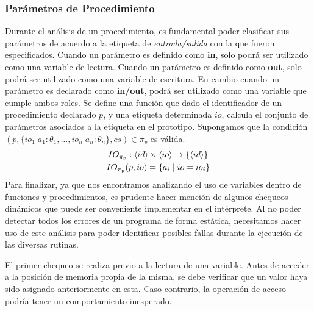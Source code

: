 \subsubsection{Parámetros de Procedimiento}

Durante el análisis de un procedimiento, es fundamental poder clasificar sus parámetros de acuerdo a la etiqueta de \textit{entrada/salida} con la que fueron especificados.
Cuando un parámetro es definido como \textbf{in}, solo podrá ser utilizado como una variable de lectura.
Cuando un parámetro es definido como \textbf{out}, solo podrá ser utilizado como una variable de escritura.
En cambio cuando un parámetro es declarado como \textbf{in/out}, podrá ser utilizado como una variable que cumple ambos roles.
Se define una función que dado el identificador de un procedimiento declarado $p$, y una etiqueta determinada $io$, calcula el conjunto de parámetros asociados a la etiqueta en el prototipo.
Supongamos que la condición $(p, \{ io_1 \; a_1: \theta_1, \ldots, io_n \; a_n: \theta_n \}, cs) \in \pi_{p}$ es válida.
\begin{gather*}
IO_{\pi_{p}} : \langle id \rangle \times \langle io \rangle \rightarrow \{ \langle id \rangle \}
\\
IO_{\pi_{p}}(p, io) = \{ a_i \mid io = io_i \}
\end{gather*}
Para finalizar, ya que nos encontramos analizando el uso de variables dentro de funciones y procedimientos, es prudente hacer mención de algunos chequeos dinámicos que puede ser conveniente implementar en el intérprete.
Al no poder detectar todos los errores de un programa de forma estática, necesitamos hacer uso de este análisis para poder identificar posibles fallas durante la ejecución de las diversas rutinas.

El primer chequeo se realiza previo a la lectura de una variable.
Antes de acceder a la posición de memoria propia de la misma, se debe verificar que un valor haya sido asignado anteriormente en esta.
Caso contrario, la operación de acceso podría tener un comportamiento inesperado.
\fi
